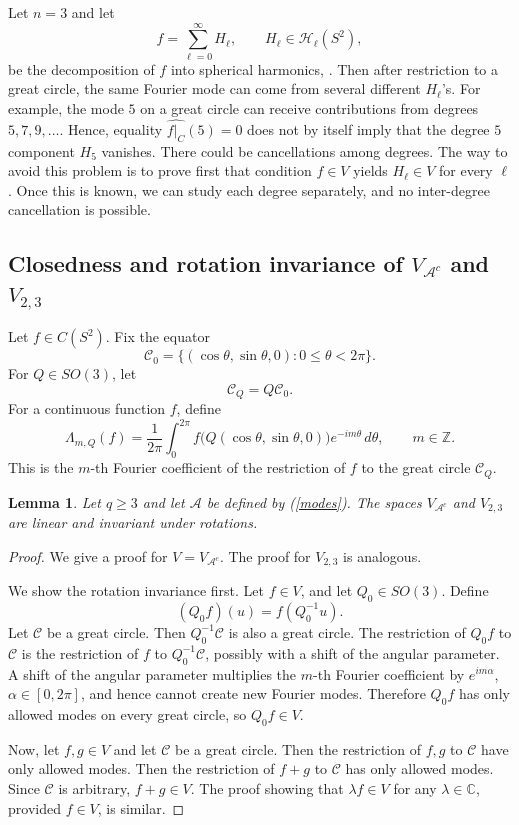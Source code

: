 \documentclass[11pt]{article}
\newtheorem{lemma}[theorem]{Lemma}
\theoremstyle{definition}
\begin{document}
Let $n=3$ and let 
\[
f=\sum_{\ell=0}^\infty H_\ell,\qquad H_\ell\in\mathcal H_\ell(S^2),
\]
be  the decomposition of $f$ into spherical harmonics, \cite{Sch2}.
Then after restriction to a great circle, the same Fourier mode can come from several
different \(H_\ell\)'s. For example, the mode \(5\) on a great circle can receive
contributions from degrees \(5,7,9,\dots\).
Hence,   equality
$\widehat{f|_C}(5)=0$
does not by itself imply that the degree \(5\) component $H_5$ vanishes. There could be
cancellations among degrees.
The way to avoid this problem is to prove first that
condition 
$f\in V$ yields $ H_\ell\in V$ for every $\ell$.
Once this is known, we can study each degree separately, and no inter-degree cancellation
is possible.



\subsection{Closedness and rotation invariance of \(V_{{\mathcal A}^c} \) and \(V_{2,3}\)}

Let $f\in C(S^2)$.
Fix the equator
\[
{\mathcal C}_0=\{(\cos\theta,\sin\theta,0):0\le\theta<2\pi\}.
\]
For \(Q\in SO(3)\), let
\[
{\mathcal C}_Q=Q {\mathcal C}_0.
\]
For a continuous function \(f\), define
\[
\Lambda_{m,Q}(f)
=
\frac1{2\pi}\int_0^{2\pi}
f\bigl(Q(\cos\theta,\sin\theta,0)\bigr)e^{-im\theta}\,d\theta,\qquad m\in{\mathbb Z}.
\]
This is the \(m\)-th Fourier coefficient of the restriction of \(f\) to the great circle
\({\mathcal C}_Q\).

\begin{lemma}
Let $q\ge 3$ and let ${\mathcal A}$ be defined by  (\ref{modes}). The spaces \(V_{{\mathcal A}^c} \) and \(V_{2,3}\) are linear  and invariant under rotations.
\end{lemma}

\begin{proof} We give a proof for \(V=V_{{\mathcal A}^c} \). The proof for \(V_{2,3}\) is analogous.
	
	
	We show the rotation invariance first.
	Let \(f\in V\), and let \(Q_0\in SO(3)\). Define
	\[
	(Q_0 f)(u)=f(Q_0^{-1}u).
	\]
	Let \({\mathcal C}\) be a great circle. Then \(Q_0^{-1}{\mathcal C}\) is also a great circle. The restriction
	of \(Q_0f\) to \({\mathcal C}\) is the restriction of \(f\) to \(Q_0^{-1}{\mathcal C}\), possibly with a shift
	of the angular parameter. A shift of the angular parameter multiplies the \(m\)-th Fourier
	coefficient by \(e^{im\alpha}\), $\alpha\in [0,2\pi]$, and hence cannot create new Fourier modes. Therefore
	\(Q_0f\) has only allowed modes on every great circle, so \(Q_0f\in V\).
	
	Now, let $f,g\in V$ and let \({\mathcal C}\) be a great circle. Then the restriction of $f, g$ to \({\mathcal C}\) have only allowed modes. Then the restriction of $f+g$ to \({\mathcal C}\) has only allowed modes. Since \({\mathcal C}\) is arbitrary, $f+g\in V$. The proof  showing that $\lambda f\in V$ for any $\lambda\in {\mathbb C}$, provided $f\in V$, is similar.
	\end{proof}
\end{document}
